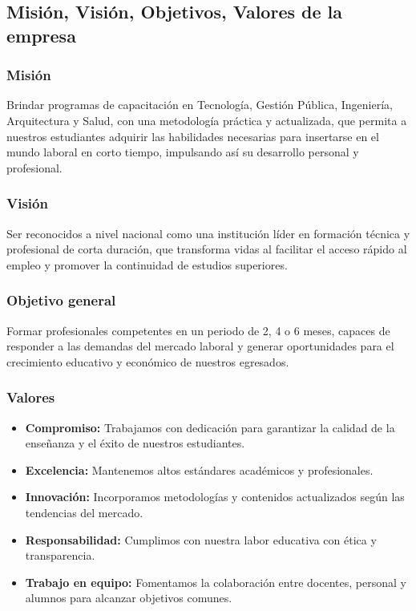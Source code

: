 \subsection{Misión, Visión, Objetivos, Valores de la empresa}


\subsubsection{Misión}
Brindar programas de capacitación en Tecnología, Gestión Pública, Ingeniería, Arquitectura y Salud, con una metodología práctica y actualizada, que permita a nuestros estudiantes adquirir las habilidades necesarias para insertarse en el mundo laboral en corto tiempo, impulsando así su desarrollo personal y profesional.

\subsubsection{Visión}
Ser reconocidos a nivel nacional como una institución líder en formación técnica y profesional de corta duración, que transforma vidas al facilitar el acceso rápido al empleo y promover la continuidad de estudios superiores.

\subsubsection{Objetivo general}
Formar profesionales competentes en un periodo de 2, 4 o 6 meses, capaces de responder a las demandas del mercado laboral y generar oportunidades para el crecimiento educativo y económico de nuestros egresados.

\subsubsection{Valores}
\begin{itemize}
	\item \textbf{Compromiso:} Trabajamos con dedicación para garantizar la calidad de la enseñanza y el éxito de nuestros estudiantes.
	\item \textbf{Excelencia:} Mantenemos altos estándares académicos y profesionales.
	\item \textbf{Innovación:} Incorporamos metodologías y contenidos actualizados según las tendencias del mercado.
	\item \textbf{Responsabilidad:} Cumplimos con nuestra labor educativa con ética y transparencia.
	\item \textbf{Trabajo en equipo:} Fomentamos la colaboración entre docentes, personal y alumnos para alcanzar objetivos comunes.
\end{itemize}



